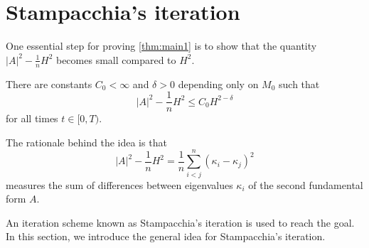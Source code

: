 \section{Stampacchia's iteration}
One essential step for proving \autoref{thm:main1} is to show that the quantity $\left| A \right| ^2-\frac{1}{n}H^2$ becomes small compared to $H^2$.

\begin{theorem} \label{PinEs}
	There are constants $C_0<\infty $ and $\delta >0$ depending only on $M_0$ such that 
	\[\left| A \right| ^2-\frac{1}{n}H^2 \leq C_0 H^{2-\delta }\]
	for all times $t \in [0,T)$. 
\end{theorem}

The rationale behind the idea is that
\[\left| A \right| ^2-\frac{1}{n}H^2=\frac{1}{n}\sum_{i<j}^{n}(\kappa _i-\kappa _j)^2\]
measures the sum of differences between eigenvalues $\kappa _i$ of the second fundamental form $A$. 

An iteration scheme known as Stampacchia's iteration is used to reach the goal. In this section, we introduce the general idea for Stampacchia's iteration.

